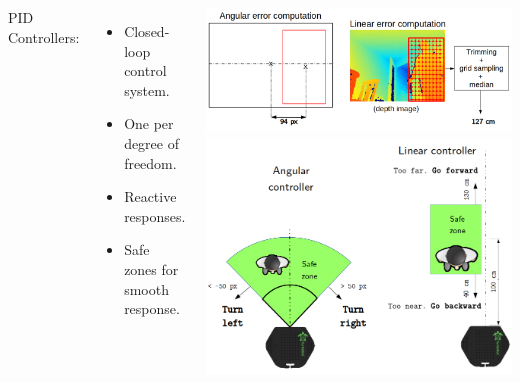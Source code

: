 \documentclass[11pt]{beamer}
\begin{document}
\begin{frame}[allowframebreaks]
\begin{columns}
	\end{columns}
	\vspace{6cm}
	\begin{columns}
	PID Controllers:
	\vspace{0.5cm}
	\begin{itemize}
		\item Closed-loop control system.
		\item One per degree of freedom.
		\item Reactive responses.
		\item Safe zones for smooth response.
	\end{itemize}
	\begin{center}
		\includegraphics[width=\linewidth]{controller_error_computation}\\
		\vspace{0.5cm}
		\includegraphics[width=\linewidth]{velocity_controllers}

	\end{center}
\end{columns}
	
\end{frame}
\end{document}

